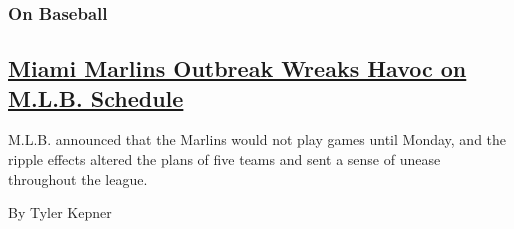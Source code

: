 \begin{enumerate}
\begin{enumerate}
    \hypertarget{on-baseball}{%
    \subsubsection{On Baseball}\label{on-baseball}}

    \hypertarget{miami-marlins-outbreak-wreaks-havoc-on-mlb-schedule}{%
    \subsection{\texorpdfstring{\href{/2020/07/28/sports/baseball/marlins-outbreak-mlb-coronavirus.html}{Miami
    Marlins Outbreak Wreaks Havoc on M.L.B.
    Schedule}}{Miami Marlins Outbreak Wreaks Havoc on M.L.B. Schedule}}\label{miami-marlins-outbreak-wreaks-havoc-on-mlb-schedule}}

    M.L.B. announced that the Marlins would not play games until Monday,
    and the ripple effects altered the plans of five teams and sent a
    sense of unease throughout the league.

    By Tyler Kepner
  \end{enumerate}
\end{enumerate}

